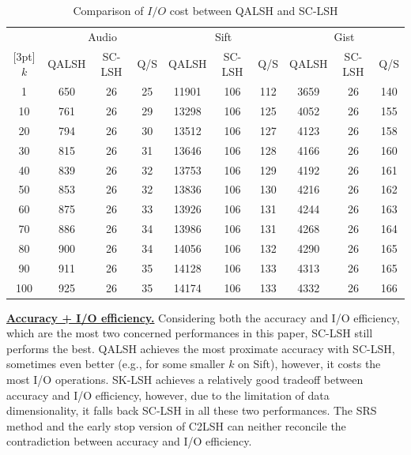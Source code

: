 \documentclass[twocolumn]{svjour3}          %
\newcommand{\btitle}[1]{\vspace{1ex}\noindent\underline{\textbf{#1}}}
\begin{document}
\begin{table}[!htb]
	\centering
	\caption{Comparison of $I/O$ cost between QALSH and SC-LSH}\label{tbl:io}
	\begin{tabular}{|c|c|c|c|c|c|c|c|c|c|}
		\hline
		& \multicolumn{3}{c|}{Audio} & \multicolumn{3}{c|}{Sift} & \multicolumn{3}{c|}{Gist} \\
		\cline{2-10}
		\raisebox{1.2ex}[3pt]{$k$} & QALSH & SC-LSH & Q/S & QALSH & SC-LSH & Q/S & QALSH & SC-LSH & Q/S \\
		\hline
		
		1 & 650 & 26 & 25 & 11901 & 106 & 112 & 3659 & 26 & 140 \\
		10 & 761 & 26 & 29 & 13298 & 106 & 125 & 4052 & 26 & 155 \\
		20 & 794 & 26 & 30 & 13512 & 106 & 127 & 4123 & 26 & 158 \\
		30 & 815 & 26 & 31 & 13646 & 106 & 128 & 4166 & 26 & 160 \\
		40 & 839 & 26 & 32 & 13753 & 106 & 129 & 4192 & 26 & 161 \\
		50 & 853 & 26 & 32 & 13836 & 106 & 130 & 4216 & 26 & 162 \\
		60 & 875 & 26 & 33 & 13926 & 106 & 131 & 4244 & 26 & 163 \\
		70 & 886 & 26 & 34 & 13986 & 106 & 131 & 4268 & 26 & 164 \\
		80 & 900 & 26 & 34 & 14056 & 106 & 132 & 4290 & 26 & 165 \\
		90 & 911 & 26 & 35 & 14128 & 106 & 133 & 4313 & 26 & 165 \\
		100 & 925 & 26 & 35 & 14174 & 106 & 133 & 4332 & 26 & 166 \\
		
		\hline
	\end{tabular}
\end{table}


\noindent\btitle{Accuracy + I/O efficiency.} Considering both the accuracy and I/O efficiency, which are the most two concerned performances in this paper, SC-LSH still performs the best.
QALSH achieves the most proximate accuracy with SC-LSH, sometimes even better (e.g., for some smaller $k$ on Sift), however, it costs the most I/O operations. SK-LSH achieves a relatively good tradeoff between accuracy and I/O efficiency, however, due to the limitation of data dimensionality, it falls back SC-LSH in all these two performances. The SRS method and the early stop version of C2LSH can neither reconcile the contradiction between accuracy and I/O efficiency.
\end{document}
